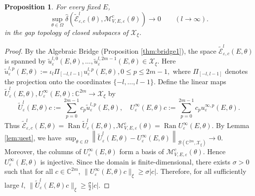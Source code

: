 \documentclass[reqno,11pt]{amsart}
\newtheorem{proposition}{Proposition}[section]
\newcommand{\C}{{\mathbb C}}
\begin{document}
\begin{proposition}
\label{prop:gap}
For every fixed $E$,
$$\sup_{\theta\in\Omega}\widehat\delta\left(
\widetilde{\mathcal E}_{\varepsilon,c}^l(\theta),
\mathcal M_{V,E,\varepsilon}^{c}(\theta)\right)
\rightarrow 0\qquad (l\to\infty).
$$
in the gap topology of closed subspaces of $\mathcal X_\xi$.
\end{proposition}
\begin{proof}
By the Algebraic Bridge  (Proposition \ref{thm:bridge1}), the space
$\widetilde{\mathcal E}_{\varepsilon,c}^l(E,\theta)$ is spanned by 
$
\widetilde u_{\varepsilon}^{l,0}(E,\theta),\ldots,
\widetilde u_{\varepsilon}^{l,2m-1}(E,\theta)\in \mathcal X_\xi .
$
Here
$
\widetilde u_{\varepsilon}^{l,p}(E,\theta):=
\iota_l\Pi_{[-l,l-1]} u_{\varepsilon}^{l,p}(E,\theta), 0\le p\le 2m-1,
$
where $\Pi_{[-l,l-1]}$ denotes the projection onto the coordinates
$\{-l,\ldots,l-1\}$. 
Define the linear maps $\widetilde U_{\varepsilon}^{l}(E,\theta),U_{\varepsilon}^{\infty}(E,\theta):\C^{2m}\to \mathcal X_\xi$ by
$$
\widetilde U_{\varepsilon}^{l}(E,\theta)c
:=\sum_{p=0}^{2m-1}c_p\widetilde u_{\varepsilon}^{l,p}(E,\theta),\quad U_{\varepsilon}^{\infty}(E,\theta)c
:=\sum_{p=0}^{2m-1}c_p u_{\varepsilon}^{\infty,p}(E,\theta).
$$
Thus
$
\widetilde{\mathcal E}_{\varepsilon,c}^l(E,\theta)
=\operatorname{Ran}\widetilde U_{\varepsilon}^{l}(E,\theta),
\mathcal M_{V,E,\varepsilon}^{c}(\theta)
=\operatorname{Ran}U_{\varepsilon}^{\infty}(E,\theta).
$
By Lemma \ref{lem:uest}, we have
$
\sup_{\theta\in\Omega}\left\|\widetilde U_{\varepsilon}^{l}(E,\theta)-
U_{\varepsilon}^{\infty}(E,\theta)\right\|_{\mathcal B(\mathbb C^{2m},\mathcal X_\xi)}
\rightarrow 0 .
$
Moreover, the columns of $U_{\varepsilon}^{\infty}(E,\theta)$ form a basis of
$\mathcal M_{V,E,\varepsilon}^{c}(\theta)$. Hence
$U_{\varepsilon}^{\infty}(E,\theta)$ is injective. Since the domain is
finite-dimensional, there exists $\sigma>0$ such that for all $c\in  \C^{2m}$,
$
\|U_{\varepsilon}^{\infty}(E,\theta)c\|_{\xi}\ge \sigma |c|.
$
Therefore, for all sufficiently large $l$,
$
\|\widetilde U_{\varepsilon}^{l}(E,\theta)c\|_{\xi}\ge \frac{\sigma}{2}|c|.
$


\end{proof}
\end{document}
